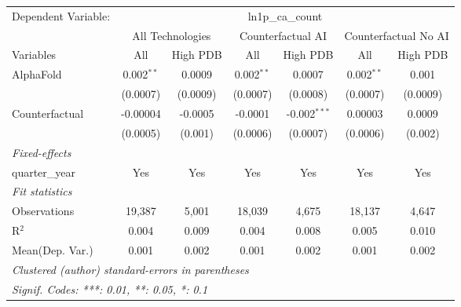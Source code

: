 \begingroup
\centering
\begin{tabular}{lcccccc}
   \tabularnewline \midrule \midrule
   Dependent Variable: & \multicolumn{6}{c}{ln1p\_ca\_count}\\
 & \multicolumn{2}{c}{All Technologies} & \multicolumn{2}{c}{Counterfactual AI} & \multicolumn{2}{c}{Counterfactual No AI} \\
\cmidrule(lr){1-1}\cmidrule(lr){2-3} \cmidrule(lr){4-5} \cmidrule(lr){6-7}
Variables & \multicolumn{1}{c}{All} & \multicolumn{1}{c}{High PDB} & \multicolumn{1}{c}{All} & \multicolumn{1}{c}{High PDB} & \multicolumn{1}{c}{All} & \multicolumn{1}{c}{High PDB} \\
\cmidrule(lr){1-1}\cmidrule(lr){2-2} \cmidrule(lr){3-3} \cmidrule(lr){4-4} \cmidrule(lr){5-5} \cmidrule(lr){6-6} \cmidrule(lr){7-7}
   AlphaFold      & 0.002$^{**}$ & 0.0009   & 0.002$^{**}$ & 0.0007         & 0.002$^{**}$ & 0.001\\   
                  & (0.0007)     & (0.0009) & (0.0007)     & (0.0008)       & (0.0007)     & (0.0009)\\   
   Counterfactual & -0.00004     & -0.0005  & -0.0001      & -0.002$^{***}$ & 0.00003      & 0.0009\\   
                  & (0.0005)     & (0.001)  & (0.0006)     & (0.0007)       & (0.0006)     & (0.002)\\   
   \midrule
   \emph{Fixed-effects}\\
   quarter\_year  & Yes          & Yes      & Yes          & Yes            & Yes          & Yes\\  
   \midrule
   \emph{Fit statistics}\\
   Observations   & 19,387       & 5,001    & 18,039       & 4,675          & 18,137       & 4,647\\  
   R$^2$          & 0.004        & 0.009    & 0.004        & 0.008          & 0.005        & 0.010\\  
Mean(Dep. Var.) & 0.001 & 0.002 & 0.001 & 0.002 & 0.001 & 0.002 \\
   \midrule \midrule
   \multicolumn{7}{l}{\emph{Clustered (author) standard-errors in parentheses}}\\
   \multicolumn{7}{l}{\emph{Signif. Codes: ***: 0.01, **: 0.05, *: 0.1}}\\
\end{tabular}
\par\endgroup
